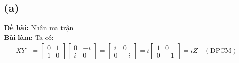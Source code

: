 \subsection{(a)}
\textbf{Đề bài:} Nhân ma trận.\\
\textbf{Bài làm:}
Ta có:
\begin{align*}
    XY & = \begin{bmatrix}
               0 & 1 \\
               1 & 0
           \end{bmatrix}
    \begin{bmatrix}
        0 & -i \\
        i & 0
    \end{bmatrix}
    = \begin{bmatrix}
          i & 0  \\
          0 & -i
      \end{bmatrix} = i\begin{bmatrix}
                           1 & 0  \\
                           0 & -1
                       \end{bmatrix} = iZ \quad (\text{ĐPCM})
\end{align*}

